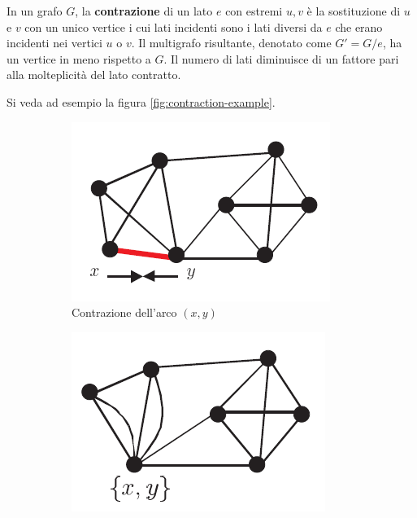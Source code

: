 \begin{defn}
In un grafo $ G $, la \textbf{contrazione} di un lato $e$ con estremi $u, v$ è la sostituzione di $ u $ e $ v $ con un unico vertice i cui lati incidenti sono i lati diversi da $ e $ che erano incidenti nei vertici $ u $ o $ v $.
Il multigrafo risultante, denotato come $G' = G/e$, ha un vertice in meno rispetto a $G$. Il numero di lati diminuisce di un fattore pari alla molteplicità del lato contratto.
\end{defn}

\noindent Si veda ad esempio la figura \ref{fig:contraction-example}.



\begin{figure}[h]
     \centering
     \begin{subfigure}[b]{0.3\textwidth}
             \centering
             \includegraphics[width=\textwidth]{./images/contract-original-graph.png}
             \caption{Contrazione dell'arco $(x, y)$}
             \label{fig:original-graph}
     \end{subfigure}
   	\hfill
     \begin{subfigure}[b]{0.3\textwidth}
             \centering
             \includegraphics[width=\textwidth]{./images/contract-xy.png}

\end{subfigure}
\end{figure}
